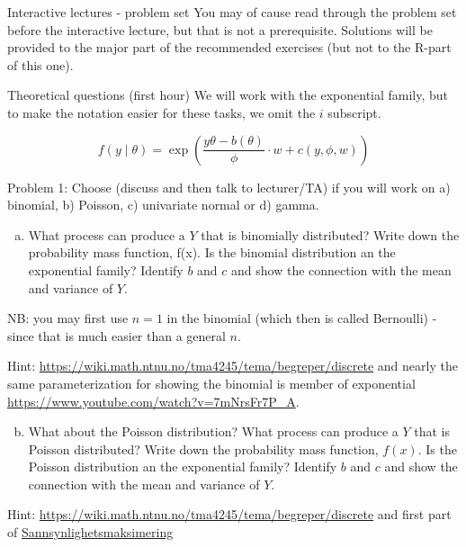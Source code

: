 \documentclass[
  ignorenonframetext,
]{beamer}
\providecommand{\tightlist}{%
  \setlength{\itemsep}{0pt}\setlength{\parskip}{0pt}}
\begin{document}
\begin{frame}{Interactive lectures - problem set}
\protect\hypertarget{interactive-lectures---problem-set}{}
You may of cause read through the problem set before the interactive
lecture, but that is not a prerequisite. Solutions will be provided to
the major part of the recommended exercises (but not to the R-part of
this one).

\begin{block}{Theoretical questions (first hour)}
\protect\hypertarget{theoretical-questions-first-hour}{}
We will work with the exponential family, but to make the notation
easier for these tasks, we omit the \(i\) subscript.

\[ f(y \mid \theta)=\exp \left( \frac{y \theta-b(\theta)}{\phi}\cdot w + c(y, \phi, w) \right) \]

\begin{block}{Problem 1:}
\protect\hypertarget{problem-1}{}
Choose (discuss and then talk to lecturer/TA) if you will work on a)
binomial, b) Poisson, c) univariate normal or d) gamma.
\end{block}
\end{block}
\end{frame}

\begin{frame}
\begin{enumerate}
[a)]
\tightlist
\item
  What process can produce a \(Y\) that is binomially distributed? Write
  down the probability mass function, f(x). Is the binomial distribution
  an the exponential family? Identify \(b\) and \(c\) and show the
  connection with the mean and variance of \(Y\).
\end{enumerate}

NB: you may first use \(n=1\) in the binomial (which then is called
Bernoulli) - since that is much easier than a general \(n\).

Hint: \url{https://wiki.math.ntnu.no/tma4245/tema/begreper/discrete} and
nearly the same parameterization for showing the binomial is member of
exponential \url{https://www.youtube.com/watch?v=7mNrsFr7P_A}.

\begin{enumerate}
[a)]
\setcounter{enumi}{1}
\tightlist
\item
  What about the Poisson distribution? What process can produce a \(Y\)
  that is Poisson distributed? Write down the probability mass function,
  \(f(x)\). Is the Poisson distribution an the exponential family?
  Identify \(b\) and \(c\) and show the connection with the mean and
  variance of \(Y\).
\end{enumerate}

Hint: \url{https://wiki.math.ntnu.no/tma4245/tema/begreper/discrete} and
first part of
\href{https://mediasite.ntnu.no/Mediasite/Play/db9c6fbc45bf48abb8a4dd00ff146e081d?catalog=0fce6173-7a98-4db7-84b7-50cba3a3a341}{Sannsynlighetsmaksimering}
\end{frame}
\end{document}
